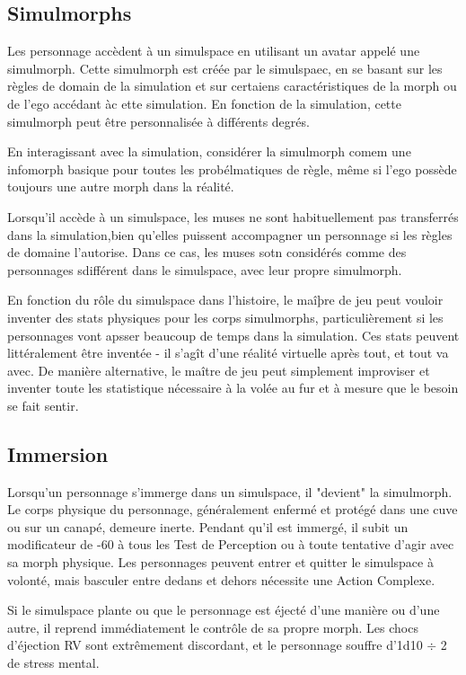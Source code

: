 \subsection{Simulmorphs} 

Les personnage accèdent à un simulspace en utilisant un avatar appelé une simulmorph. Cette simulmorph est créée par le simulspaec, en se basant sur les règles de domain de la simulation et sur certaiens caractéristiques de la morph ou de l'ego accédant àc ette simulation. En fonction de la simulation, cette simulmorph peut être personnalisée à différents degrés. 

En interagissant avec la simulation, considérer la simulmorph comem une infomorph basique pour toutes les probélmatiques de règle, même si l'ego possède toujours une autre morph dans la réalité. 

Lorsqu'il accède à un simulspace, les muses ne sont habituellement pas transferrés dans la simulation,bien qu'elles puissent accompagner un personnage si les règles de domaine l'autorise. Dans ce cas, les muses sotn considérés comme des personnages sdifférent dans le simulspace, avec leur propre simulmorph. 

En fonction du rôle du simulspace dans l'histoire, le maîþre de jeu peut vouloir inventer des stats physiques pour les corps simulmorphs, particulièrement si les personnages vont apsser beaucoup de temps dans la simulation. Ces stats peuvent littéralement être inventée - il s'agît d'une réalité virtuelle après tout, et tout va avec. De manière alternative, le maître de jeu peut simplement improviser et inventer toute les statistique nécessaire à la volée au fur et à mesure que le besoin se fait sentir. 

\subsection{Immersion} 

Lorsqu'un personnage s'immerge dans un simulspace, il "devient" la simulmorph. Le corps physique du personnage, généralement enfermé et protégé dans une cuve ou sur un canapé, demeure inerte. Pendant qu'il est immergé, il subit un modificateur de -60 à tous les Test de Perception ou à toute tentative d'agir avec sa morph physique. Les personnages peuvent entrer et quitter le simulspace à volonté, mais basculer entre dedans et dehors nécessite une Action Complexe. 

Si le simulspace plante ou que le personnage est éjecté d'une manière ou d'une autre, il reprend immédiatement le contrôle de sa propre morph. Les chocs d'éjection RV sont extrêmement discordant, et le personnage souffre d'1d10 $\div$ 2 de stress mental. 



